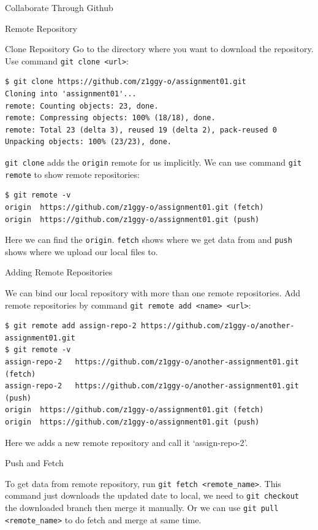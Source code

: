 \documentclass[10pt, a4papaer]{article}
\begin{document}
\begin{section}{Collaborate Through Github}
\begin{subsection}{Remote Repository}
\begin{subsubsection}{Clone Repository}
Go to the directory where you want to download the repository. Use command
\verb|git clone <url>|:

\begin{lstlisting}
$ git clone https://github.com/z1ggy-o/assignment01.git
Cloning into 'assignment01'...
remote: Counting objects: 23, done.
remote: Compressing objects: 100% (18/18), done.
remote: Total 23 (delta 3), reused 19 (delta 2), pack-reused 0
Unpacking objects: 100% (23/23), done.
\end{lstlisting}

\verb|git clone| adds the \verb|origin| remote for us implicitly. We can use
command \verb|git remote| to show remote repositories:

\begin{lstlisting}
$ git remote -v
origin	https://github.com/z1ggy-o/assignment01.git (fetch)
origin	https://github.com/z1ggy-o/assignment01.git (push)
\end{lstlisting}

Here we can find the \verb|origin|. \verb|fetch| shows where we get data from
and \verb|push| shows where we upload our local files to.

\begin{paragraph}{Adding Remote Repositories\\}

We can bind our local repository with more than one remote repositories. Add remote
repositories by command \verb|git remote add <name> <url>|:

\begin{lstlisting}
$ git remote add assign-repo-2 https://github.com/z1ggy-o/another-assignment01.git
$ git remote -v
assign-repo-2	https://github.com/z1ggy-o/another-assignment01.git (fetch)
assign-repo-2	https://github.com/z1ggy-o/another-assignment01.git (push)
origin	https://github.com/z1ggy-o/assignment01.git (fetch)
origin	https://github.com/z1ggy-o/assignment01.git (push)
\end{lstlisting}

Here we adds a new remote repository and call it `assign-repo-2'.
\end{paragraph}

\begin{subsubsection}{Push and Fetch}
    
\end{subsubsection}
To get data from remote repository, run \verb|git fetch <remote_name>|. This 
command just downloads the updated date to local, we need to \verb|git checkout|
the downloaded branch then merge it manually.
Or we can use \verb|git pull <remote_name>| to do fetch and merge at same time.


\end{subsubsection}
\end{subsection}
\end{section}
\end{document}
